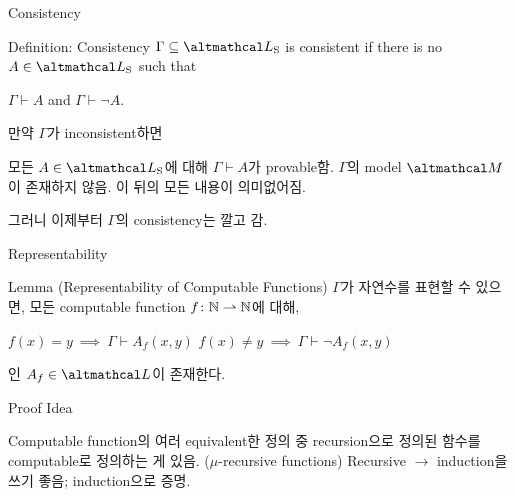 \documentclass[../231120_msquare_computational-logic.tex]{subfiles}
\begin{document}
\begin{frame}{Consistency}
    \begin{block}{Definition: Consistency}
        \(\Gamma \subseteq \LS\) is consistent if there is no \(A \in \LS\) such that
        \begin{itemize}
            \ii \(\Gamma \vdash A\) and \(\Gamma \vdash \lnot A\).
        \end{itemize}
    \end{block} \pause

    \begin{exampleblock}{만약 \(\Gamma\)가 inconsistent하면}
        \begin{itemize}
            \ii 모든 \(A \in \LS\)에 대해 \(\Gamma \vdash A\)가 provable함.
            \ii \(\Gamma\)의 model \(\mcal M\)이 존재하지 않음.
            \ii 이 뒤의 모든 내용이 의미없어짐.
        \end{itemize}
        그러니 이제부터 \(\Gamma\)의 consistency는 깔고 감.
    \end{exampleblock}
\end{frame}

\begin{frame}{Representability}
    
    \begin{block}{Lemma (Representability of Computable Functions)}
        \(\Gamma\)가 자연수를 표현할 수 있으면,
        모든 computable function \(f \colon \mathbb{N} \rightharpoonup \mathbb{N}\)에 대해,
        \begin{itemize}
            \ii\(f(x) = y \ \implies\ \Gamma \vdash A_f(x, y)\)
            \ii\(f(x) \neq y \ \implies\ \Gamma \vdash \lnot A_f(x, y)\)
        \end{itemize}
        인 \(A_f \in \Lang\)이 존재한다.
    \end{block}
    \pause
    \begin{block}{Proof Idea}
        \begin{itemize}
            \ii Computable function의 여러 equivalent한 정의 중
                recursion으로 정의된 함수를 computable로 정의하는 게 있음. (\(\mu\)-recursive functions)
            \ii Recursive \(\to\) induction을 쓰기 좋음; induction으로 증명.
        \end{itemize}
    \end{block}

\end{frame}
\end{document}

